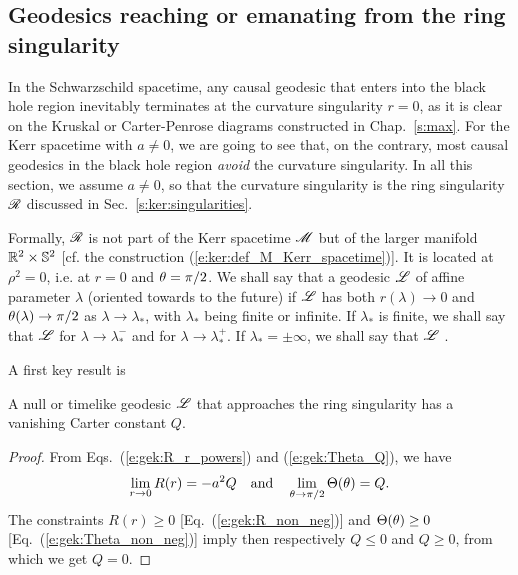 \subsection{Geodesics reaching or emanating from the ring singularity}

In the Schwarzschild spacetime, any causal geodesic that enters into the black
hole region inevitably terminates at the curvature singularity $r=0$, as it
is clear on the Kruskal or Carter-Penrose diagrams constructed in Chap.~\ref{s:max}.
For the Kerr spacetime with $a\neq 0$, we are going to see that, on the contrary,
most causal geodesics in the black hole region \emph{avoid} the curvature
singularity. In all this section, we assume $a\neq 0$, so that the
curvature singularity is the ring singularity $\mathscr{R}$
discussed in Sec.~\ref{s:ker:singularities}.

Formally, $\mathscr{R}$ is not
part of the Kerr spacetime $\mathscr{M}$ but of the larger manifold $\mathbb{R}^2\times\mathbb{S}^2$
[cf. the construction (\ref{e:ker:def_M_Kerr_spacetime})]. It is located
at $\rho^2 = 0$, i.e. at $r=0$ and
$\theta=\pi/2$. We shall say that a
geodesic $\mathscr{L}$ of affine parameter $\lambda$ (oriented towards to the future)
if $\mathscr{L}$ has both
$r(\lambda)\to 0$ and $\theta(\lambda) \to \pi/2$ as $\lambda\to\lambda_*$, with
$\lambda_*$ being finite or infinite. If $\lambda_*$ is finite, we shall say
that $\mathscr{L}$ 
for $\lambda\to\lambda_*^-$ and
for $\lambda\to\lambda_*^+$. If $\lambda_*=\pm\infty$, we shall say
that $\mathscr{L}$ .

A first key result is
\begin{greybox}
A null or timelike geodesic $\mathscr{L}$ that approaches the ring singularity has
a vanishing Carter constant $Q$.
\end{greybox}
\begin{proof}
From Eqs.~(\ref{e:gek:R_r_powers}) and (\ref{e:gek:Theta_Q}), we have
\[
 \lim_{r\to 0} R(r) = - a^2 Q \quad\mbox{and}\quad
 \lim_{\theta\to \pi/2} \Theta(\theta) = Q .
\]
The constraints $R(r) \geq 0$ [Eq.~(\ref{e:gek:R_non_neg})]
and $\Theta(\theta)\geq 0$ [Eq.~(\ref{e:gek:Theta_non_neg})] imply then respectively
$Q \leq 0$ and $Q\geq 0$, from which we get $Q=0$.
\end{proof}

